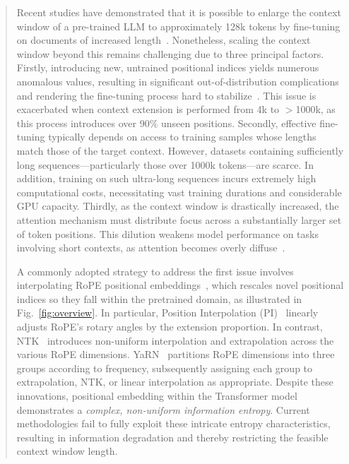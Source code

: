\begin{abstract}
Recent studies have demonstrated that it is possible to enlarge the context window of a pre-trained LLM to approximately 128k tokens by fine-tuning on documents of increased length~\cite{longlora,pi,yarn,zhang2024soaring,liu2023scaling}. Nonetheless, scaling the context window beyond this remains challenging due to three principal factors. Firstly, introducing new, untrained positional indices yields numerous anomalous values, resulting in significant out-of-distribution complications and rendering the fine-tuning process hard to stabilize~\cite{pi}. This issue is exacerbated when context extension is performed from 4k to $>$1000k, as this process introduces over 90\% unseen positions. Secondly, effective fine-tuning typically depends on access to training samples whose lengths match those of the target context. However, datasets containing sufficiently long sequences—particularly those over 1000k tokens—are scarce. In addition, training on such ultra-long sequences incurs extremely high computational costs, necessitating vast training durations and considerable GPU capacity. Thirdly, as the context window is drastically increased, the attention mechanism must distribute focus across a substantially larger set of token positions. This dilution weakens model performance on tasks involving short contexts, as attention becomes overly diffuse~\cite{pi}.

A commonly adopted strategy to address the first issue involves interpolating RoPE positional embeddings~\cite{rope,pi}, which rescales novel positional indices so they fall within the pretrained domain, as illustrated in Fig.~\ref{fig:overview}. In particular, Position Interpolation (PI)~\cite{pi} linearly adjusts RoPE’s rotary angles by the extension proportion. In contrast, NTK~\cite{ntk,dynamicntk} introduces non-uniform interpolation and extrapolation across the various RoPE dimensions. YaRN~\cite{yarn} partitions RoPE dimensions into three groups according to frequency, subsequently assigning each group to extrapolation, NTK, or linear interpolation as appropriate. Despite these innovations, positional embedding within the Transformer model demonstrates a \emph{complex, non-uniform information entropy}. Current methodologies fail to fully exploit these intricate entropy characteristics, resulting in information degradation and thereby restricting the feasible context window length.


\end{abstract}
